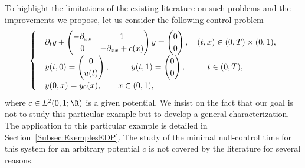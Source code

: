 To highlight the limitations of the existing literature on such problems and the improvements we propose, let us consider the following control problem
\begin{equation*}
\begin{cases}
& \partial_t y +
\begin{pmatrix} - \partial_{xx} & 1 \\ 0 & -\partial_{xx} + c(x)
\end{pmatrix} y =
\begin{pmatrix} 0 \\ 0
\end{pmatrix},
\quad (t,x) \in (0,T) \times (0,1),
\\
&y(t,0) =
\begin{pmatrix}
0 \\ u(t)
\end{pmatrix}, \mkern47mu y(t,1) =
\begin{pmatrix}
0 \\ 0
\end{pmatrix}, \quad \mkern 29mu t\in (0,T),
\\
&y(0,x) = y_0(x), \qquad x \in (0,1),
\end{cases}
\end{equation*}
where $c\in L^2(0,1;\R)$ is a given potential. We insist on the fact that our goal is not to study this particular example but to develop a general characterization. The application to this particular example is detailed in Section~\ref{Subsec:ExemplesEDP}. The study of the minimal null-control time for this system for an arbitrary potential $c$ is not covered by the literature for several reasons.
